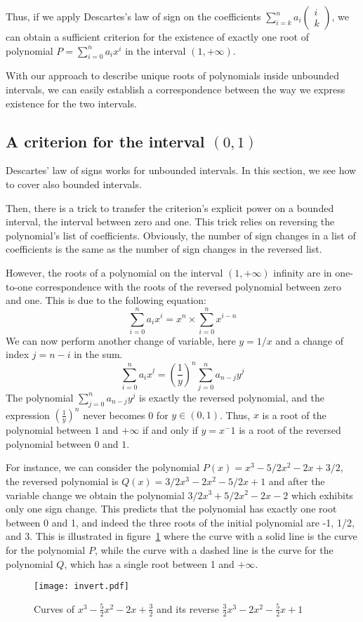 \documentclass{article}
\begin{document}
Thus, if we apply Descartes's law of sign on the coefficients
\(\sum_{i=k}^{n}a_i\left(\begin{array}{c}i\\k\end{array}\right)\), we
can obtain a sufficient criterion for the existence of exactly one
root of polynomial \(P=\sum_{i=0}^{n}a_ix^i\) in the interval
\((1,+\infty)\).

With our approach to describe unique roots of polynomials inside
unbounded intervals, we can easily establish a correspondence between
the way we express existence for the two intervals.
\subsection{A criterion for the interval \((0,1)\)}
Descartes' law of signs works for unbounded intervals.  In this
section, we see how to cover also bounded intervals.

Then, there is a trick to transfer the criterion's explicit power on a
bounded interval, the interval between zero and one. This trick relies
on reversing the polynomial's list of coefficients.  Obviously, the
number of sign changes in a list of coefficients is the same as the
number of sign changes in the reversed list.

However, the roots of a polynomial on the interval \((1,+\infty)\)
infinity are in one-to-one correspondence with the roots of the
reversed polynomial between zero and one. This is due to the following
equation:
\[\sum_{i=0}^{n}a_i x^i = x^n\times\sum_{i=0}^{n}x^{i-n}\]
We can now perform another change of variable, here \(y=1/x\) and a
change of index \(j=n-i\) in the sum.
\[\sum_{i=0}^{n}a_i x^l = (\frac{1}{y})^n \sum_{j=0}^{n}a_{n-j} y^j\]
The polynomial \(\sum_{j=0}^{n} a_{n-j}y^j\) is exactly the reversed
polynomial, and the expression \((\frac{1}{y})^n\) never becomes 0 for
\(y\in (0,1)\).  Thus, \(x\) is a root of the polynomial between \(1\)
and \(+\infty\) if and only if \(y=x^-1\) is a root of the reversed
polynomial between \(0\) and \(1\).

For instance, we can consider the polynomial \(P(x) = x^3 - 5/2 x^2 - 2 x + 3/2\),
the reversed polynomial is \(Q(x) = 3/2 x^3 - 2 x^2 - 5/2 x + 1\) and after
the variable change we obtain the polynomial \(3/2 x^3 + 5/2 x^2 - 2 x - 2\)
which exhibits only one sign change.  This predicts that the polynomial has
exactly one root between 0 and 1, and indeed the three roots of the initial
polynomial are -1, 1/2, and 3.  This is illustrated in
figure~\ref{invert} where the curve with a solid line is the curve for the
polynomial \(P\), while the curve with a dashed line is the curve for
the polynomial \(Q\), which has a single root between 1 and \(+\infty\).
\begin{figure}\label{invert}
\begin{center}
\texttt{[image: invert.pdf]}
\end{center}
\caption{Curves of \(x^3 -\frac{5}{2} x^2 - 2 x +
  \frac{3}{2}\)
and its reverse \(\frac{3}{2}x^3 -2 x^2 - \frac{5}{2} x + 1\)}
\end{figure}
\end{document}
